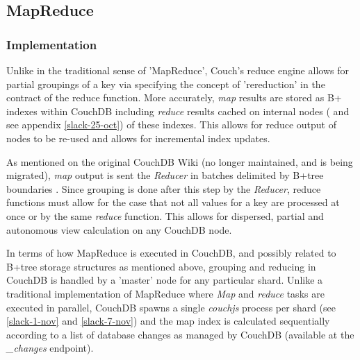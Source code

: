 \subsection{MapReduce}
\subsubsection{Implementation}
Unlike in the traditional sense of 'MapReduce', Couch's reduce engine allows for partial groupings of a key via specifying the concept of 'rereduction' in the contract of the reduce function. More accurately, \textit{map} results are stored as B+ indexes within CouchDB including \textit{reduce} results cached on internal nodes (\cite{reduceFunctions} and see appendix \ref{slack-25-oct}) of these indexes. This allows for reduce output of nodes to be re-used and allows for incremental index updates.

As mentioned on the original CouchDB Wiki (no longer maintained, and is being migrated), \textit{map} output is sent the \textit{Reducer} in batches delimited by B+tree boundaries \cite{couchwiki}. Since grouping is done after this step by the \textit{Reducer}, reduce functions must allow for the case that not all values for a key are processed at once or by the same \textit{reduce} function. This allows for dispersed, partial and autonomous view calculation on any CouchDB node.

In terms of how MapReduce is executed in CouchDB, and possibly related to B+tree storage structures as mentioned above, grouping and reducing in CouchDB is handled by a 'master' node for any particular shard. Unlike a traditional implementation of MapReduce where \textit{Map} and \textit{reduce} tasks are executed in parallel, CouchDB spawns a single \textit{couchjs} process per shard (see \ref{slack-1-nov} and \ref{slack-7-nov}) and the map index is calculated sequentially according to a list of database changes as managed by CouchDB (available at the \textit{\_changes} endpoint).


